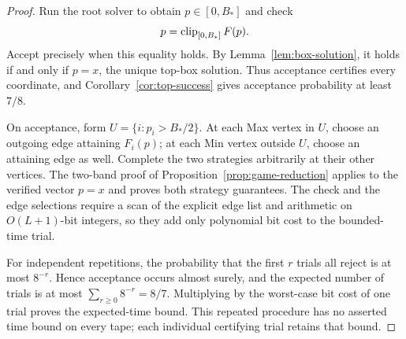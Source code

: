 \begin{proof}
Run the root solver to obtain $p\in[0,B_*]$ and check
\[
                 p=\operatorname{clip}_{[0,B_*]}F(p).
\]
Accept precisely when this equality holds. By
Lemma~\ref{lem:box-solution}, it holds if and only if $p=x$, the
unique top-box solution. Thus acceptance certifies every coordinate,
and Corollary~\ref{cor:top-success} gives acceptance probability at
least $7/8$.

On acceptance, form $U=\{i:p_i>B_*/2\}$. At each Max vertex in
$U$, choose an outgoing edge attaining $F_i(p)$; at each Min vertex
outside $U$, choose an attaining edge as well. Complete the two
strategies arbitrarily at their other vertices. The two-band proof of
Proposition~\ref{prop:game-reduction} applies to the verified vector
$p=x$ and proves both strategy guarantees. The check and the edge
selections require a scan of the explicit edge list and arithmetic on
$O(L+1)$-bit integers, so they add only polynomial bit cost to the
bounded-time trial.

For independent repetitions, the probability that the first $r$ trials
all reject is at most $8^{-r}$. Hence acceptance occurs almost surely,
and the expected number of trials is at most
$\sum_{r\ge0}8^{-r}=8/7$. Multiplying by the worst-case bit cost of
one trial proves the expected-time bound. This repeated procedure has
no asserted time bound on every tape; each individual certifying trial
retains that bound.
\end{proof}
